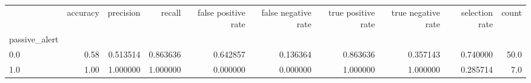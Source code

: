 \begin{tabular}{lrrrrrrrrr}
\toprule
{} &  accuracy &  precision &    recall &  false positive rate &  false negative rate &  true positive rate &  true negative rate &  selection rate &  count \\
passive\_alert &           &            &           &                      &                      &                     &                     &                 &        \\
\midrule
0.0           &      0.58 &   0.513514 &  0.863636 &             0.642857 &             0.136364 &            0.863636 &            0.357143 &        0.740000 &   50.0 \\
1.0           &      1.00 &   1.000000 &  1.000000 &             0.000000 &             0.000000 &            1.000000 &            1.000000 &        0.285714 &    7.0 \\
\bottomrule
\end{tabular}
